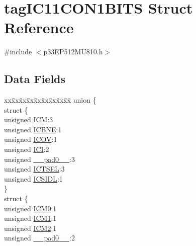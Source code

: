 \hypertarget{structtag_i_c11_c_o_n1_b_i_t_s}{}\section{tag\+I\+C11\+C\+O\+N1\+B\+I\+TS Struct Reference}
\label{structtag_i_c11_c_o_n1_b_i_t_s}


{\ttfamily \#include $<$p33\+E\+P512\+M\+U810.\+h$>$}

\subsection*{Data Fields}
\begin{DoxyCompactItemize}
\item 
\begin{tabbing}
xx\=xx\=xx\=xx\=xx\=xx\=xx\=xx\=xx\=\kill
union \{\\
\>struct \{\\
\>\>unsigned \hyperlink{structtag_i_c11_c_o_n1_b_i_t_s_ad3edde44ecb2d349ffa2decd0a251c20}{ICM}:3\\
\>\>unsigned \hyperlink{structtag_i_c11_c_o_n1_b_i_t_s_a824e7dcca83939e1b049d63ffcee33e9}{ICBNE}:1\\
\>\>unsigned \hyperlink{structtag_i_c11_c_o_n1_b_i_t_s_a49392949376ba0bf58cf8db889e86c94}{ICOV}:1\\
\>\>unsigned \hyperlink{structtag_i_c11_c_o_n1_b_i_t_s_a72486dcb868aad2d5c978494691356cc}{ICI}:2\\
\>\>unsigned \hyperlink{structtag_i_c11_c_o_n1_b_i_t_s_adf71f3d8410c1f1dbbc96680a92c49af}{\_\_pad0\_\_}:3\\
\>\>unsigned \hyperlink{structtag_i_c11_c_o_n1_b_i_t_s_a7a9dd41b5f93eb620df7fa336e452677}{ICTSEL}:3\\
\>\>unsigned \hyperlink{structtag_i_c11_c_o_n1_b_i_t_s_af441b36127c0bb7a35162dfc9a64103c}{ICSIDL}:1\\
\>\} \\
\>struct \{\\
\>\>unsigned \hyperlink{structtag_i_c11_c_o_n1_b_i_t_s_a649b1dd9bca75e558f37a9f52a829bd4}{ICM0}:1\\
\>\>unsigned \hyperlink{structtag_i_c11_c_o_n1_b_i_t_s_af3fe77ef9f8ca41ff11519f445e7bc77}{ICM1}:1\\
\>\>unsigned \hyperlink{structtag_i_c11_c_o_n1_b_i_t_s_a3c62c9cbbc3a406402126c932b709db8}{ICM2}:1\\
\>\>unsigned \hyperlink{structtag_i_c11_c_o_n1_b_i_t_s_adf71f3d8410c1f1dbbc96680a92c49af}{\_\_pad0\_\_}:2\\

\end{tabbing}
\end{DoxyCompactItemize}

